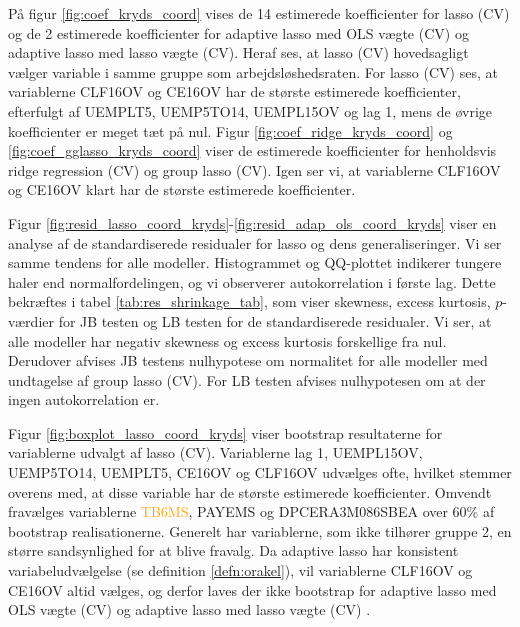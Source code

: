 På figur \ref{fig:coef_kryds_coord} vises de 14 estimerede koefficienter for lasso (CV) og de 2 estimerede koefficienter for adaptive lasso med OLS vægte (CV) og adaptive lasso med lasso vægte (CV).
Heraf ses, at lasso (CV) hovedsagligt vælger variable i samme gruppe som arbejdsløshedsraten.
For lasso (CV) ses, at variablerne \textcolor{blue3}{CLF16OV} og \textcolor{blue3}{CE16OV} har de største estimerede koefficienter, efterfulgt af \textcolor{blue3}{UEMPLT5}, \textcolor{blue3}{UEMP5TO14}, \textcolor{blue3}{UEMPL15OV} og \textcolor{blue3}{lag 1}, mens de øvrige koefficienter er meget tæt på nul. 
Figur \ref{fig:coef_ridge_kryds_coord} og \ref{fig:coef_gglasso_kryds_coord} viser de estimerede koefficienter for henholdsvis ridge regression (CV) og group lasso (CV).
Igen ser vi, at variablerne \textcolor{blue3}{CLF16OV} og \textcolor{blue3}{CE16OV} klart har de største estimerede koefficienter.    
%

Figur \ref{fig:resid_lasso_coord_kryds}-\ref{fig:resid_adap_ols_coord_kryds} viser en analyse af de standardiserede residualer for lasso og dens generaliseringer. 
Vi ser samme tendens for alle modeller. Histogrammet og QQ-plottet indikerer tungere haler end normalfordelingen, og vi observerer autokorrelation i første lag.
Dette bekræftes i tabel \ref{tab:res_shrinkage_tab}, som viser skewness, excess kurtosis, $p$-værdier for JB testen og LB testen for de standardiserede residualer.
Vi ser, at alle modeller har negativ skewness og excess kurtosis forskellige fra nul. 
Derudover afvises JB testens nulhypotese om normalitet for alle modeller med undtagelse af group lasso (CV).
For LB testen afvises nulhypotesen om at der ingen autokorrelation er.

Figur \ref{fig:boxplot_lasso_coord_kryds} viser bootstrap resultaterne for variablerne udvalgt af lasso (CV).
Variablerne \textcolor{blue3}{lag 1}, \textcolor{blue3}{UEMPL15OV}, \textcolor{blue3}{UEMP5TO14}, \textcolor{blue3}{UEMPLT5}, \textcolor{blue3}{CE16OV} og \textcolor{blue3}{CLF16OV} udvælges ofte, hvilket stemmer overens med, at disse variable har de største estimerede koefficienter.
Omvendt fravælges variablerne \textcolor{orange}{TB6MS}, \textcolor{blue3}{PAYEMS} og \textcolor{red3}{DPCERA3M086SBEA} over 60\% af bootstrap realisationerne. 
Generelt har variablerne, som ikke tilhører gruppe 2, en større sandsynlighed for at blive fravalg.
Da adaptive lasso har konsistent variabeludvælgelse (se definition \ref{defn:orakel}), vil variablerne \textcolor{blue3}{CLF16OV} og \textcolor{blue3}{CE16OV} altid vælges, og derfor laves der ikke bootstrap for adaptive lasso med OLS vægte (CV) og adaptive lasso med lasso vægte (CV) .

